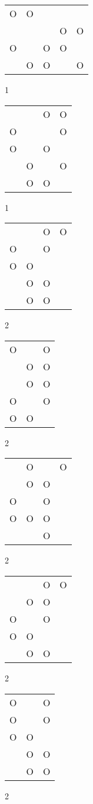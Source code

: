 \begin{tabular}{|m{0.2cm}m{0.2cm}m{0.2cm}m{0.2cm}m{0.2cm}|}\hline
O&O& & & \\
 & & &O&O\\
O& &O&O& \\
 &O&O& &O\\
\hline\end{tabular}1
\begin{tabular}{|m{0.2cm}m{0.2cm}m{0.2cm}m{0.2cm}|}\hline
 & &O&O\\
O& & &O\\
O& &O& \\
 &O& &O\\
 &O&O& \\
\hline\end{tabular}1
\begin{tabular}{|m{0.2cm}m{0.2cm}m{0.2cm}m{0.2cm}|}\hline
 & &O&O\\
O& &O& \\
O&O& & \\
 &O&O& \\
 &O&O& \\
\hline\end{tabular}2
\begin{tabular}{|m{0.2cm}m{0.2cm}m{0.2cm}|}\hline
O& &O\\
 &O&O\\
 &O&O\\
O& &O\\
O&O& \\
\hline\end{tabular}2
\begin{tabular}{|m{0.2cm}m{0.2cm}m{0.2cm}m{0.2cm}|}\hline
 &O& &O\\
 &O&O& \\
O& &O& \\
O&O&O& \\
 & &O& \\
\hline\end{tabular}2
\begin{tabular}{|m{0.2cm}m{0.2cm}m{0.2cm}m{0.2cm}|}\hline
 & &O&O\\
 &O&O& \\
O& &O& \\
O&O& & \\
 &O&O& \\
\hline\end{tabular}2
\begin{tabular}{|m{0.2cm}m{0.2cm}m{0.2cm}|}\hline
O& &O\\
O& &O\\
O&O& \\
 &O&O\\
 &O&O\\
\hline\end{tabular}2
